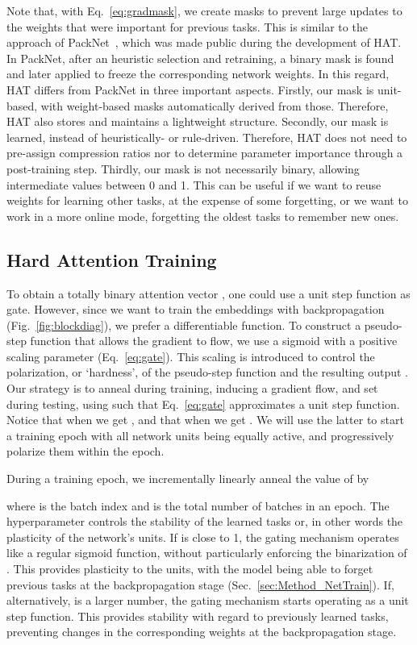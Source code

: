 Note that, with Eq.~\ref{eq:gradmask}, we create masks to prevent large updates to the weights that were important for previous tasks. This is similar to the approach of PackNet~\cite{Mallya17ARXIV}, which was made public during the development of HAT. In PackNet, after an heuristic selection and retraining, a binary mask is found and later applied to freeze the corresponding network weights. In this regard, HAT differs from PackNet in three important aspects. 
Firstly, our mask is unit-based, with weight-based masks automatically derived from those. Therefore, HAT also stores and maintains a lightweight structure.
Secondly, our mask is learned, instead of heuristically- or rule-driven. Therefore, HAT does not need to pre-assign compression ratios nor to determine parameter importance through a post-training step. Thirdly, our mask is not necessarily binary, allowing intermediate values between 0 and 1. This can be useful if we want to reuse weights for learning other tasks, at the expense of some forgetting, or we want to work in a more online mode, forgetting the oldest tasks to remember new ones. 

\subsection{Hard Attention Training}
\label{sec:Method_AttTrain}

To obtain a totally binary attention vector , one could use a unit step function as gate. However, since we want to train the embeddings  with backpropagation (Fig.~\ref{fig:blockdiag}), we prefer a differentiable function. To construct a pseudo-step function that allows the gradient to flow, we use a sigmoid with a positive scaling parameter  (Eq.~\ref{eq:gate}). This scaling is introduced to control the polarization, or `hardness', of the pseudo-step function and the resulting output . Our strategy is to anneal  during training, inducing a gradient flow, and set  during testing, using  such that Eq.~\ref{eq:gate} approximates a unit step function. Notice that when  we get , and that when  we get . We will use the latter to start a training epoch with all network units being equally active, and progressively polarize them within the epoch.

During a training epoch, we incrementally linearly anneal the value of  by

where  is the batch index and  is the total number of batches in an epoch. The hyperparameter  controls the stability of the learned tasks or, in other words the plasticity of the network's units. If  is close to 1, the gating mechanism operates like a regular sigmoid function, without particularly enforcing the binarization of . This provides plasticity to the units, with the model being able to forget previous tasks at the backpropagation stage (Sec.~\ref{sec:Method_NetTrain}). If, alternatively,  is a larger number, the gating mechanism starts operating as a unit step function. This provides stability with regard to previously learned tasks, preventing changes in the corresponding weights at the backpropagation stage.

